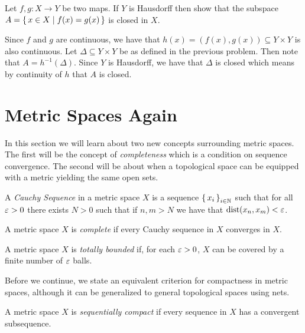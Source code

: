 \documentclass[letterpaper, 11pt]{article}
\begin{document}
\clearpage

\begin{exercise}
  Let $f, g\colon X \to Y$ be two maps.
  If $Y$ is Hausdorff then show that the subspace $A = \set{x \in X \mid f(x) = g(x)}$ is closed in $X$.
\end{exercise}
\begin{pf}
  Since $f$ and $g$ are continuous, we have that $h(x) = (f(x), g(x)) \subseteq Y \times Y$ is also continuous.
  Let $\Delta \subseteq Y \times Y$ be as defined in the previous problem.
  Then note that $A = h^{-1}(\Delta)$.
  Since $Y$ is Hausdorff, we have that $\Delta$ is closed which means by continuity of $h$ that $A$ is closed.
\end{pf}

\clearpage

\section{Metric Spaces Again}

In this section we will learn about two new concepts surrounding metric spaces.
The first will be the concept of \emph{completeness} which is a condition on sequence convergence.
The second will be about when a topological space can be equipped with a metric yielding the same open sets.

\begin{defn}
  A \emph{Cauchy Sequence} in a metric space $X$ is a sequence $\set{x_{i}}_{i \in \mathbb{N}}$ such that for all $\varepsilon > 0$ there exists $N > 0$ such that if $n, m > N$ we have that $\operatorname{dist}(x_{n}, x_{m}) < \varepsilon$.
\end{defn}

\begin{defn}[Completeness]
  A metric space $X$ is \emph{complete} if every Cauchy sequence in $X$ converges in $X$.
\end{defn}

\begin{defn}
  A metric space $X$ is \emph{totally bounded} if, for each $\varepsilon > 0$, $X$ can be covered by a finite number of $\varepsilon$ balls.
\end{defn}

Before we continue, we state an equivalent criterion for compactness in metric spaces, although it can be generalized to general topological spaces using nets.

\begin{defn}
  A metric space $X$ is \emph{sequentially compact} if every sequence in $X$ has a convergent subsequence.
\end{defn}
\end{document}
